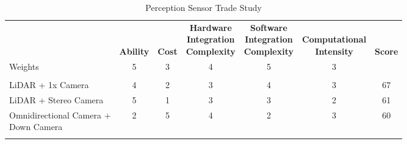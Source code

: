 \documentclass[12pt]{extarticle}
\begin{document}
		\begin{table}[H]
		\begin{adjustwidth}{0in}{0in}
		\setlength{\dashlinedash}{.4pt}
		\setlength\tabcolsep{4pt}
		\def\arraystretch{1.3}
		\centering
		
		\caption*{\sffamily\fontsize{12}{14}\selectfont 
		Perception Sensor Trade Study}
		\label{PerceptionSensorTable}
		
		\vspace{1em}

		\begin{tabular}{lcccccc}
		\hline
                                                                     & \makecell{\\ \\ \textbf{Ability}} & \makecell{\\ \\ \textbf{Cost}} & \makecell{\textbf{Hardware} \\ \textbf{Integration} \\ \textbf{Complexity}} & \makecell{\textbf{Software} \\ \textbf{Integration} \\ \textbf{Complexity}} & \makecell{ \\ \textbf{Computational} \\ \textbf{Intensity}} & \makecell{\\ \\ \textbf{Score}} \\ 
		Weights                                                      & 5       & 3    & 4                               & 5                               & 3                       &       \\ \hline
		\\[-2ex]
		LiDAR + 1x Camera                                            & 4       & 2    & 3                               & 4                               & 3                       & 67    \\ \hdashline
		LiDAR + Stereo Camera                                        & 5       & 1    & 3                               & 3                               & 2                       & 61    \\ \hdashline
		\makecell[l]{Omnidirectional Camera + \\ Down Camera}        & 2       & 5    & 4                               & 2                               & 3                       & 60    \\ \hdashline

\end{tabular}
\end{adjustwidth}
\end{table}
\end{document}
